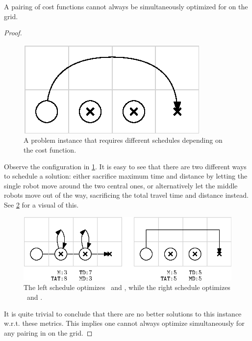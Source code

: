 \begin{lemma}\label{lemma:simultaneous_1}
	A pairing of cost functions  cannot always be simultaneously optimized for on the grid. 
\end{lemma}

\begin{proof}

	\begin{figure}[h]
		\centering
		\includegraphics[width=0.5\linewidth]{ipe/sim1_problem.eps}
		\caption{
			A problem instance that requires different schedules depending on the cost function.
		}
		\label{fig:sim1}
	\end{figure}

	Observe the configuration in \cref{fig:sim1}. It is easy to see that there are two different ways to schedule a solution: either sacrifice maximum time and distance by letting the single robot move around the two central ones, or alternatively let the middle robots move out of the way, sacrificing the total travel time and distance instead. See \cref{fig:sim1_strat} for a visual of this.

	\begin{figure}[h]
		\centering
		\includegraphics[width=\linewidth]{ipe/sim1_strat.eps}
		\caption{
			The left schedule optimizes \ and , while the right schedule optimizes \ and .
		}
		\label{fig:sim1_strat}
	\end{figure}

It is quite trivial to conclude that there are no better solutions to this instance w.r.t. these metrics. This implies one cannot always optimize simultaneously for any pairing in  on the grid.
\end{proof}

